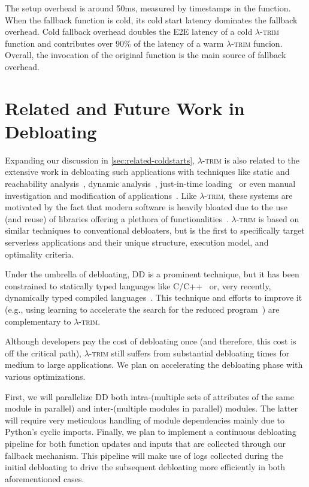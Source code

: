 \documentclass[sigplan,nonacm]{acmart}
\newcommand{\sys}{\textsc{\ensuremath{\lambda}-trim}\xspace}
\begin{document}
The setup overhead is around 50ms, measured by timestamps in the function. When the fallback function is cold, its cold start latency dominates the fallback overhead. Cold fallback overhead doubles the E2E latency of a cold \sys function and contributes over 90\% of the latency of a warm \sys funcion. Overall, the invocation of the original function is the main source of fallback overhead.

  
\section{Related and Future Work in Debloating}

Expanding our discussion in \cref{sec:related-coldstarts}, \sys is also related to the
extensive work in debloating such applications with techniques like static and reachability analysis~\cite{vulture, nibbler2019, piece-wise2018}, dynamic analysis~\cite{piece-wise2018, dynamic-binary14},
just-in-time loading~\cite{blankit2020} or even manual investigation and modification of applications~\cite{less-is-more19, libprof2024}.
Like \sys, these systems are motivated by the fact that modern software is heavily bloated due to the use (and reuse) of libraries offering a plethora of functionalities~\cite{bloating-study17, pybloat2024,kuo20cozart}.
\sys is based on similar techniques to conventional debloaters, but is the first to specifically target serverless applications and their unique structure, execution model, and optimality criteria.

Under the umbrella of debloating, DD is a prominent technique, but it has been constrained to statically typed languages like C/C++~\cite{delta2002} or, very recently, dynamically typed compiled languages~\cite{lithium}.
This technique and efforts to improve it (e.g., using learning to accelerate the search for the reduced program~\cite{deltarl2018}) are complementary to \sys.



Although developers pay the cost of debloating once (and therefore, this cost is off the critical path), \sys still suffers from substantial debloating times for medium to large applications.
We plan on accelerating the debloating phase with various optimizations.

First, we will parallelize DD both intra-(multiple sets of attributes of the same module in parallel) and inter-(multiple modules in parallel) modules.
The latter will require very meticulous handling of module dependencies mainly due to Python's cyclic imports.
Finally, we plan to implement a continuous debloating pipeline for both function updates and inputs that are collected through our fallback mechanism.
This pipeline will make use of logs collected during the initial debloating to drive the subsequent debloating more efficiently in both aforementioned cases.
\end{document}
